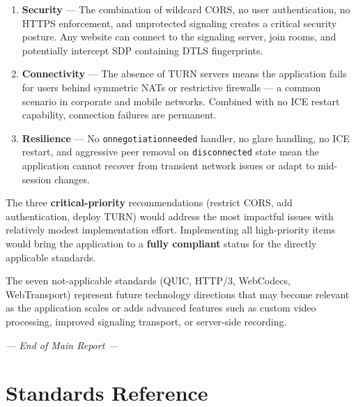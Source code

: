 \documentclass[11pt,letterpaper]{article}
\begin{document}
\begin{enumerate}[leftmargin=2em]
    \item \textbf{Security} --- The combination of wildcard CORS, no user authentication, no HTTPS enforcement, and unprotected signaling creates a critical security posture. Any website can connect to the signaling server, join rooms, and potentially intercept SDP containing DTLS fingerprints.

    \item \textbf{Connectivity} --- The absence of TURN servers means the application fails for users behind symmetric NATs or restrictive firewalls --- a common scenario in corporate and mobile networks. Combined with no ICE restart capability, connection failures are permanent.

    \item \textbf{Resilience} --- No \texttt{onnegotiationneeded} handler, no glare handling, no ICE restart, and aggressive peer removal on \texttt{disconnected} state mean the application cannot recover from transient network issues or adapt to mid-session changes.
\end{enumerate}

The three \textbf{critical-priority} recommendations (restrict CORS, add authentication, deploy TURN) would address the most impactful issues with relatively modest implementation effort. Implementing all high-priority items would bring the application to a \textbf{fully compliant} status for the directly applicable standards.

The seven not-applicable standards (QUIC, HTTP/3, WebCodecs, WebTransport) represent future technology directions that may become relevant as the application scales or adds advanced features such as custom video processing, improved signaling transport, or server-side recording.

\vspace{1cm}
\begin{center}
\textit{--- End of Main Report ---}
\end{center}

\newpage
\appendix

\section{Standards Reference}
\label{app:standards}
\end{document}
